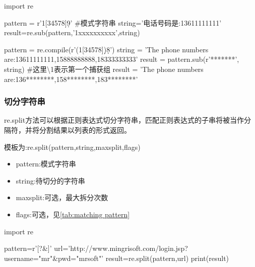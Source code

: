       \begin{codeblock}[language=python, caption={string substitution}]
        import re

        pattern = r'1[34578]\d{9}' #模式字符串
        string='电话号码是:13611111111'
        result=re.sub(pattern,'1xxxxxxxxxx',string)

        pattern = re.compile(r'(1[34578]\d)\d{8}')
        string = 'The phone numbers are:13611111111,15888888888,18333333333'
        result = pattern.sub(r'\1********', string) #这里\textbackslash 1表示第一个捕获组
        result = 'The phone numbers are:136********,158********,183********'
      \end{codeblock}

    \subsubsection{切分字符串}
      re.split方法可以根据正则表达式切分字符串，匹配正则表达式的子串将被当作分隔符，并将分割结果以列表的形式返回。

      模板为:re.split(pattern,string,\lbrack maxsplit\rbrack,\lbrack flags\rbrack)
      \begin{itemize}
        \item pattern:模式字符串
        \item string:待切分的字符串
        \item maxsplit:可选，最大拆分次数
        \item flags:可选，见\autoref{tab:matching pattern}
      \end{itemize}
      \begin{codeblock}[language=python, caption={string segmentation}]
        import re

        pattern=r'[?&]'
        url='http://www.mingrisoft.com/login.jsp?username="mr"&pwd="mrsoft"'
        result=re.split(pattern,url)
        print(result)
      \end{codeblock}
